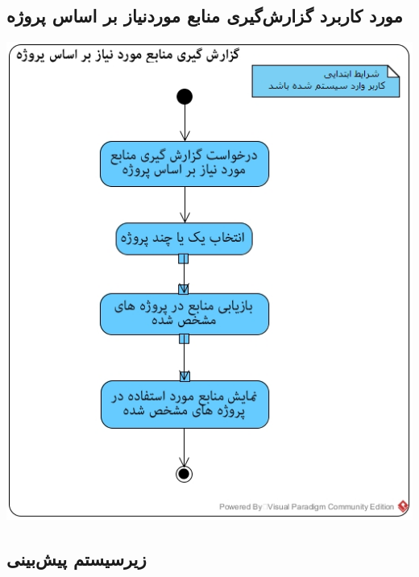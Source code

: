 \subsection*{مورد کاربرد گزارش‌گیری منابع موردنیاز بر اساس پروژه}
\vspace{2cm}
\begin{center}
\includegraphics[width=\textwidth]{ActivityDiagrams/42.jpg}
\end{center}


\newpage
\subsection{زیرسیستم پیش‌بینی}

\vspace{2cm}
